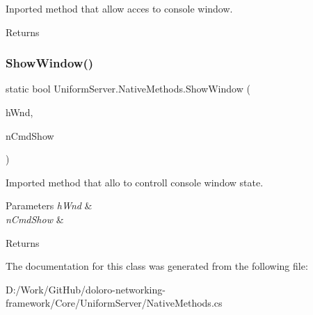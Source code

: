 Inported method that allow acces to console window. 

\begin{DoxyReturn}{Returns}

\end{DoxyReturn}
\mbox{\label{class_uniform_server_1_1_native_methods_aff29bbaf540e0aebe51ba9fd53576a86}} 
\subsubsection{\texorpdfstring{Show\+Window()}{ShowWindow()}}
{\footnotesize\ttfamily static bool Uniform\+Server.\+Native\+Methods.\+Show\+Window (\begin{DoxyParamCaption}\item[{Int\+Ptr}]{h\+Wnd,  }\item[{int}]{n\+Cmd\+Show }\end{DoxyParamCaption})}



Imported method that allo to controll console window state. 


\begin{DoxyParams}{Parameters}
{\em h\+Wnd} & \\
\hline
{\em n\+Cmd\+Show} & \\
\hline
\end{DoxyParams}
\begin{DoxyReturn}{Returns}

\end{DoxyReturn}


The documentation for this class was generated from the following file\+:\begin{DoxyCompactItemize}
\item 
D\+:/\+Work/\+Git\+Hub/doloro-\/networking-\/framework/\+Core/\+Uniform\+Server/Native\+Methods.\+cs\end{DoxyCompactItemize}
